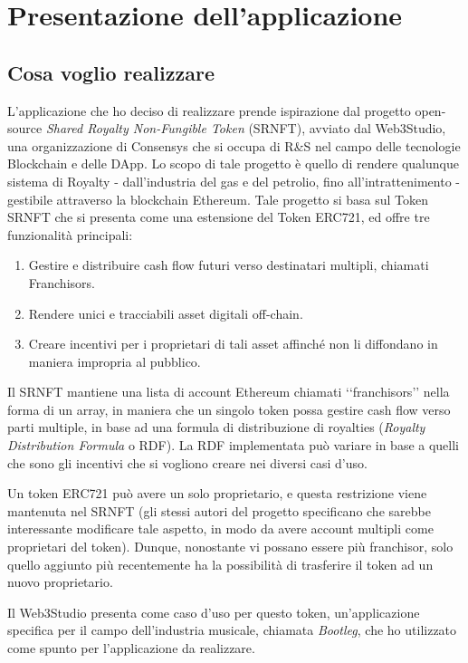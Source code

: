 \chapter{Presentazione dell'applicazione}

\section{Cosa voglio realizzare}
L'applicazione che ho deciso di realizzare prende ispirazione dal progetto open-source \textit{Shared Royalty Non-Fungible Token} (SRNFT), avviato dal Web3Studio, una organizzazione di Consensys che si occupa di R&S nel campo delle tecnologie Blockchain e delle DApp. Lo scopo di tale progetto è quello di rendere qualunque sistema di Royalty - dall'industria del gas e del petrolio, fino all'intrattenimento - gestibile attraverso la blockchain Ethereum. Tale progetto si basa sul Token SRNFT che si presenta come una estensione del Token ERC721, ed offre tre funzionalità principali:
\begin{enumerate}
    \item Gestire e distribuire cash flow futuri verso destinatari multipli, chiamati Franchisors.
    \item Rendere unici e tracciabili asset digitali off-chain.
    \item Creare incentivi per i proprietari di tali asset affinché non li diffondano in maniera impropria al pubblico.
\end{enumerate}
Il SRNFT mantiene una lista di account Ethereum chiamati ‘‘franchisors’’ nella forma di un array, in maniera che un singolo token possa gestire cash flow verso parti multiple, in base ad una formula di distribuzione di royalties (\textit{Royalty Distribution Formula} o RDF). La RDF implementata può variare in base a quelli che sono gli incentivi che si vogliono creare nei diversi casi d'uso. 

Un token ERC721 può avere un solo proprietario, e questa restrizione viene mantenuta nel SRNFT (gli stessi autori del progetto specificano che sarebbe interessante modificare tale aspetto, in modo da avere account multipli come proprietari del token). Dunque, nonostante vi possano essere più franchisor, solo quello aggiunto più recentemente ha la possibilità di trasferire il token ad un nuovo proprietario.

Il Web3Studio presenta come caso d'uso per questo token, un'applicazione specifica per il campo dell'industria musicale, chiamata \textit{Bootleg}, che ho utilizzato come spunto per l'applicazione da realizzare.

